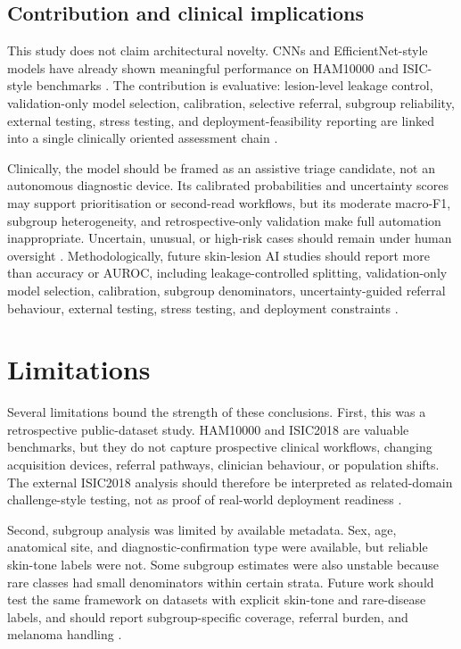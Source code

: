\documentclass[11pt,a4paper]{article}
\newcommand{\dataset}{HAM10000}
\newcommand{\isic}{ISIC2018}
\begin{document}
\subsection{Contribution and clinical implications}

This study does not claim architectural novelty. CNNs and EfficientNet-style models have already shown meaningful performance on \dataset{} and ISIC-style benchmarks \citep{tschandl2018ham10000,codella2019isic2018,gessert2020efficientnets}. The contribution is evaluative: lesion-level leakage control, validation-only model selection, calibration, selective referral, subgroup reliability, external testing, stress testing, and deployment-feasibility reporting are linked into a single clinically oriented assessment chain \citep{cassidy2022isic,young2021stress,ovadia2019uncertainty}.

Clinically, the model should be framed as an assistive triage candidate, not an autonomous diagnostic device. Its calibrated probabilities and uncertainty scores may support prioritisation or second-read workflows, but its moderate macro-F1, subgroup heterogeneity, and retrospective-only validation make full automation inappropriate. Uncertain, unusual, or high-risk cases should remain under human oversight \citep{vasey2022decideai,thomas2023deployment,krakowski2024humanai}. Methodologically, future skin-lesion AI studies should report more than accuracy or AUROC, including leakage-controlled splitting, validation-only model selection, calibration, subgroup denominators, uncertainty-guided referral behaviour, external testing, stress testing, and deployment constraints \citep{collins2024tripodai,cassidy2022isic,young2021stress,tensorflow2024tflite}.

\section{Limitations}

Several limitations bound the strength of these conclusions. First, this was a retrospective public-dataset study. \dataset{} and \isic{} are valuable benchmarks, but they do not capture prospective clinical workflows, changing acquisition devices, referral pathways, clinician behaviour, or population shifts. The external \isic{} analysis should therefore be interpreted as related-domain challenge-style testing, not as proof of real-world deployment readiness \citep{codella2019isic2018,thomas2023deployment}.

Second, subgroup analysis was limited by available metadata. Sex, age, anatomical site, and diagnostic-confirmation type were available, but reliable skin-tone labels were not. Some subgroup estimates were also unstable because rare classes had small denominators within certain strata. Future work should test the same framework on datasets with explicit skin-tone and rare-disease labels, and should report subgroup-specific coverage, referral burden, and melanoma handling \citep{groh2021fitzpatrick17k,daneshjou2022disparities,alipour2024skintype}.
\end{document}
